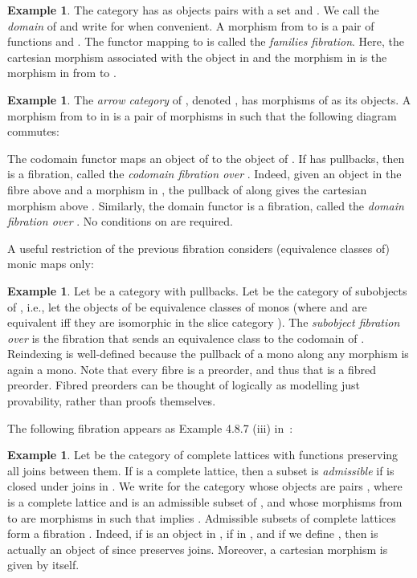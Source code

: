 \documentclass{LMCS}
\theoremstyle{plain}
\theoremstyle{remark}
\theoremstyle{definition}
\newtheorem{example}[theorem]{Example}
\begin{document}
\begin{example}\label{ex:famfib}
  The category  has as objects pairs  with  a
  set and . We call  the {\em domain} of 
  and write  for  when convenient. A morphism from  to  is a pair  of functions
   and . The functor  mapping  to
   is called the {\em families fibration}. Here, the cartesian
  morphism associated with the object  in 
  and the morphism  in  is the morphism 
  in  from  to .

\end{example}
\begin{example}\label{ex:cod}
  The {\em arrow category} of , denoted , has morphisms of
   as its objects. A morphism from  to  in
   is a pair  of morphisms in  such
  that the following diagram commutes:

\noindent
  The codomain functor  maps an object
   of  to the object  of . If  has
  pullbacks, then  is a fibration, called the {\em
    codomain fibration over }. Indeed, given an object  in the fibre above  and a morphism  in , the
  pullback of  along  gives the cartesian morphism above .
  Similarly, the domain functor  is a
  fibration, called the {\em domain fibration over }. No
  conditions on  are required.
\end{example}

A useful restriction of the previous fibration considers (equivalence
classes of) monic maps only:

\begin{example} 
\label{ex:subfib}
Let  be a category with pullbacks. Let  be the category
of subobjects of , i.e., let the objects of  be
equivalence classes of monos (where  and  are equivalent iff they are isomorphic in the slice
category ). The {\em subobject fibration over } is the
fibration  that sends an equivalence class
 to the codomain of . Reindexing is well-defined because the
pullback of a mono along any morphism is again a mono. Note that every
fibre  is a preorder, and thus that  is a fibred
preorder. Fibred preorders can be thought of logically as modelling
just provability, rather than proofs themselves.
\end{example}

The following fibration appears as Example 4.8.7 (iii) in~\cite{jac99}:

\begin{example}\label{ex:CL}
  Let  be the category of complete lattices with functions
  preserving all joins between them. If  is a complete lattice,
  then a subset  is {\em admissible} if  is closed
  under joins in . We write  for the category whose
  objects are pairs , where  is a complete lattice and 
  is an admissible subset of , and whose morphisms from  to
   are morphisms  in  such that  implies .  Admissible subsets of complete lattices
  form a fibration . Indeed, if 
  is an object in , if  in , and if we
  define , then
   is actually an object of  since  preserves
  joins. Moreover, a cartesian morphism  is given by  itself.
\end{example}
\end{document}

